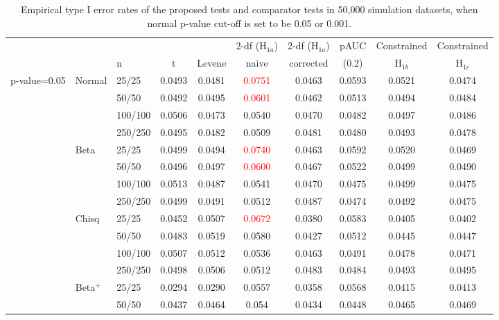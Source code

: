 \documentclass{statsoc}
\begin{document}
\begin{table}

\caption{\label{type_I_error_simulations} Empirical type I error rates of the proposed tests and comparator tests in 50,000 simulation datasets, when normal p-value cut-off is set to be 0.05 or 0.001.}
\centering
      {\begin{tabular}{@{}lllccccccc@{}}
        \hline
        &  &    &  &  & 2-df (H$_{1a}$) & 2-df (H$_{1a}$)  & pAUC &    Constrained   &       Constrained \\
& & n & t  & Levene   & naive & corrected &(0.2) & H$_{1b}$ &  H$_{1c}$   \\ \hline
p-value=0.05& Normal  & 25/25 &   0.0493 &0.0481 & \textcolor{red}{0.0751} &0.0463 &0.0593 &0.0521 &0.0474\\
& & 50/50 &    0.0492 &0.0495 &\textcolor{red}{0.0601} &0.0462 &0.0513 &0.0494 &0.0484\\
& &  100/100 &  0.0506 &0.0473 &0.0540 &0.0470 &0.0482 &0.0497 &0.0486\\
& & 250/250 & 0.0495 &0.0482 &0.0509 &0.0481 &0.0480 &0.0493 &0.0478\\
&Beta  & 25/25 &   0.0499 &0.0494 &\textcolor{red}{0.0740} &0.0463 &0.0592 &0.0520 &0.0469\\
&   &50/50 &   0.0496 &0.0497 &\textcolor{red}{0.0600} &0.0467 &0.0522 &0.0499 &0.0490\\
&   &100/100 & 0.0513 &0.0487 &0.0541 &0.0470 &0.0475 &0.0499 &0.0475\\
&   &250/250 & 0.0499 &0.0491 &0.0512 &0.0487 &0.0474 &0.0492 &0.0475\\
&Chisq &  25/25 &  0.0452 &0.0507 &\textcolor{red}{0.0672} &0.0380 &0.0583 &0.0405 &0.0402\\
&   &50/50 & 0.0483 &0.0519 &0.0580 &0.0427 &0.0512 &0.0445 &0.0447\\
&   &100/100 & 0.0507 &0.0512 &0.0536 &0.0463 &0.0491 &0.0478 &0.0471\\
&   &250/250 & 0.0498 &0.0506 &0.0512 &0.0483 &0.0484 &0.0493 &0.0495\\
&Beta$^{+}$ & 25/25 &0.0294 &0.0290 &0.0557 &0.0358 &0.0568 &0.0415 &0.0413\\
&   &50/50 &  0.0437 &0.0464 &0.054 &0.0434 &0.0448 &0.0465 &0.0469\\

\end{tabular}}
\end{table}
\end{document}
